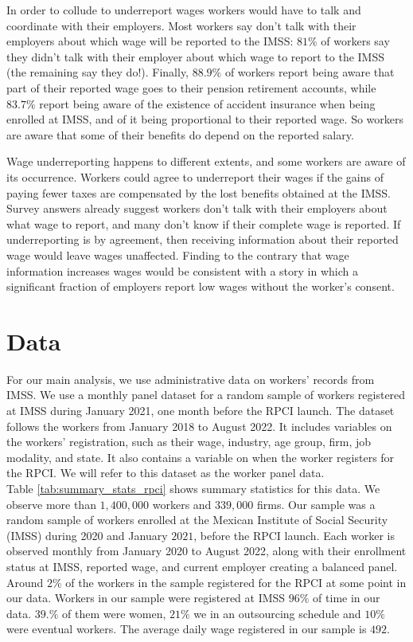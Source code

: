 \documentclass[oneside,11pt]{article}
\begin{document}
In order to collude to underreport wages workers would have to talk and coordinate with their employers. Most workers say don't talk with their employers about which wage will be reported to the IMSS: $81\%$ of workers say they didn't talk with their employer about which wage to report to the IMSS (the remaining say they do!). Finally,  $88.9\%$ of workers  report being aware that part of their reported wage goes to their pension retirement accounts, while $83.7\%$ report being aware of the existence of accident insurance when being enrolled at IMSS, and of it being proportional to their reported wage. So workers are aware that some of their benefits do depend on the reported salary.

Wage underreporting happens to different extents, and some workers are aware of its occurrence. Workers could agree to underreport their wages if the gains of paying fewer taxes are compensated by the lost benefits obtained at the IMSS. Survey answers already suggest  workers don't talk with their employers about what wage to report, and many don't know if their complete wage is reported. If underreporting is by agreement, then receiving information about their reported wage would leave wages unaffected. Finding to the contrary that wage information increases wages would be consistent with a story in which a significant fraction of employers report low wages without the worker's consent. 


\section{Data} \label{data}


For our main analysis, we use administrative data on workers' records from IMSS. We use a monthly panel dataset for a random sample of workers registered at IMSS during January 2021, one month before the RPCI launch. The dataset follows the workers from January 2018 to August 2022. It includes variables on the workers' registration, such as their wage, industry, age group, firm, job modality, and state. It also contains a variable on when the worker registers for the RPCI. We will refer to this dataset as the worker panel data. \\ 

Table \ref{tab:summary_stats_rpci} shows summary statistics for this data. We observe more than $1,400,000$ workers and $339,000$ firms. Our sample was a random sample of workers enrolled at the Mexican Institute of Social Security (IMSS) during 2020 and January $2021$, before the RPCI launch. Each worker is observed monthly from January 2020 to August 2022, along with their enrollment status at IMSS, reported wage, and current employer creating a balanced panel. Around $2\%$ of the workers in the sample registered for the RPCI at some point in our data. Workers in our sample were registered at IMSS $96\%$ of time in our data. $39.\%$ of them were women, $21\%$ we in an outsourcing schedule and $10\%$ were eventual workers. The average daily wage registered in our sample is $492$. 
\end{document}
